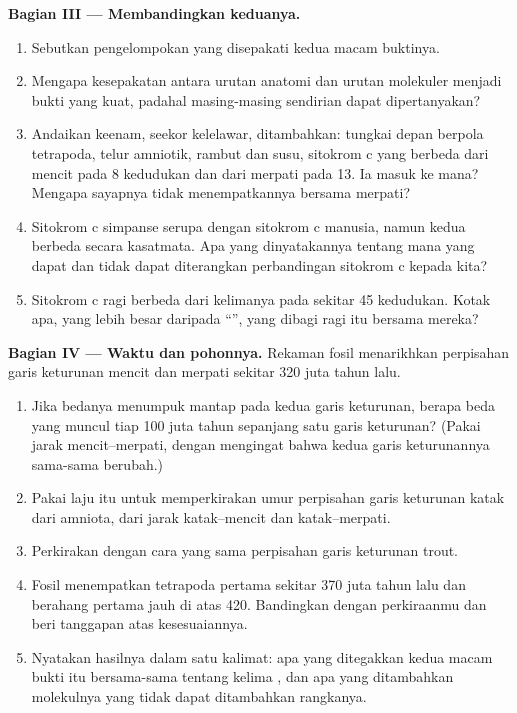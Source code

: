 \begin{problem}
\medskip
\noindent\textbf{Bagian III --- Membandingkan keduanya.}
\begin{enumerate}[resume]
  \item Sebutkan pengelompokan yang disepakati kedua macam buktinya.
  \item Mengapa kesepakatan antara urutan anatomi dan urutan molekuler
        menjadi bukti yang kuat, padahal masing-masing sendirian dapat
        dipertanyakan?
  \item Andaikan  keenam, seekor kelelawar, ditambahkan: tungkai
        depan berpola tetrapoda, telur amniotik, rambut dan susu,
        sitokrom c yang berbeda dari mencit pada 8 kedudukan dan dari
        merpati pada 13. Ia masuk ke mana? Mengapa sayapnya tidak
        menempatkannya bersama merpati?
  \item Sitokrom c simpanse serupa dengan sitokrom c manusia, namun
        kedua  berbeda secara kasatmata. Apa yang
        dinyatakannya tentang  mana yang dapat dan tidak dapat
        diterangkan perbandingan sitokrom c kepada kita?
  \item Sitokrom c ragi berbeda dari kelimanya pada sekitar 45
        kedudukan. Kotak apa, yang lebih besar daripada ``'',
        yang dibagi ragi itu bersama mereka?
\end{enumerate}

\medskip
\noindent\textbf{Bagian IV --- Waktu dan pohonnya.}
Rekaman fosil menarikhkan perpisahan garis keturunan mencit dan merpati
sekitar 320 juta tahun lalu.
\begin{enumerate}[resume]
  \item Jika bedanya menumpuk mantap pada kedua garis keturunan, berapa
        beda yang muncul tiap 100 juta tahun sepanjang satu garis
        keturunan? (Pakai jarak mencit--merpati, dengan mengingat bahwa
        kedua garis keturunannya sama-sama berubah.)
  \item Pakai laju itu untuk memperkirakan umur perpisahan garis
        keturunan katak dari amniota, dari jarak katak--mencit dan
        katak--merpati.
  \item Perkirakan dengan cara yang sama perpisahan garis keturunan trout.
  \item Fosil menempatkan tetrapoda pertama sekitar 370 juta tahun lalu
        dan  berahang pertama jauh di atas 420. Bandingkan
        dengan perkiraanmu dan beri tanggapan atas kesesuaiannya.
  \item Nyatakan hasilnya dalam satu kalimat: apa yang ditegakkan kedua
        macam bukti itu bersama-sama tentang kelima , dan apa
        yang ditambahkan molekulnya yang tidak dapat ditambahkan rangkanya.
\end{enumerate}
\end{problem}
